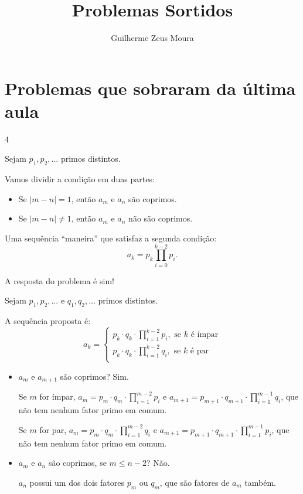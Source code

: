 \documentclass[11pt,a4paper]{article}
\title{Problemas Sortidos}
\author{Guilherme Zeus Moura}
\begin{document}
	
	\zeustitle

	\section{Problemas que sobraram da última aula}
	\setcounter{prob}4

	\begin{sk}
		Sejam $p_1, p_2, \dots$ primos distintos.

		Vamos dividir a condição em duas partes:
		\begin{itemize}
			\item Se $|m - n| = 1$, então  $a_m$ e $a_n$ são coprimos.
			\item Se $|m - n| \neq 1$, então  $a_m$ e $a_n$ não são coprimos.
		\end{itemize}

		Uma sequência ``maneira'' que satisfaz a segunda condição:
		\[a_k = p_k \prod_{i = 0}^{k-2} p_i.\] 
	\end{sk}

	\begin{sol}
		A resposta do problema é sim! 

		Sejam $p_1, p_2, \dots$ e $q_1, q_2, \dots$ primos distintos.

		A sequência proposta é:
		\[a_k = \begin{cases} p_k \cdot q_k \cdot \prod_{i=1}^{k-2} p_i, \text{\ se $k$ é ímpar}\\
		 					  p_k \cdot q_k \cdot \prod_{i=1}^{k-2} q_i, \text{\ se $k$ é par}\\
		\end{cases}\]

		\begin{itemize}
			\item $a_m$ e $a_{m+1}$ são coprimos? Sim.

				Se $m$ for ímpar,
				$a_m = p_m \cdot q_m \cdot \prod_{i=1}^{m-2} p_i$
				e $a_{m+1} = p_{m+1} \cdot q_{m+1} \cdot \prod_{i=1}^{m-1} q_i$, que não tem nenhum fator primo em comum.
				
				Se $m$ for par,
				$a_m = p_m \cdot q_m \cdot \prod_{i=1}^{m-2} q_i$
				e $a_{m+1} = p_{m+1} \cdot q_{m+1} \cdot \prod_{i=1}^{m-1} p_i$, que não tem nenhum fator primo em comum.

			\item $a_{m}$ e $a_n$ são coprimos, se $m \le n - 2$? Não.  

				 $a_n$ possui um dos dois fatores $p_m$ ou $q_m$, que são fatores de $a_m$ também.
		\end{itemize}
	\end{sol}
\end{document}
